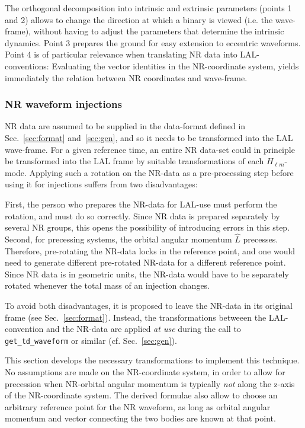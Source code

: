 \documentclass[11pt,tightenlines,article,amssymb,amsmath,amsfonts,superscriptaddress]{revtex4}
\newcommand{\lNR}{\hat L}
\begin{document}
The orthogonal decomposition into intrinsic and extrinsic parameters
(points 1 and 2) allows to change the direction at which a binary is
viewed (i.e. the wave-frame), without having to adjust the parameters
that determine the intrinsic dynamics.  Point 3 prepares the ground
for easy extension to eccentric waveforms.
Point 4 is of particular relevance when translating NR data into
LAL-conventions: Evaluating the vector identities in the NR-coordinate
system, yields immediately the relation between NR coordinates and
wave-frame.


\subsubsection{NR waveform injections}

NR data are assumed to be supplied in the data-format defined in
Sec.~\ref{sec:format} and~\ref{sec:gen}, and so it needs to be
transformed into the LAL wave-frame.  For a given reference time, an
entire NR data-set could in principle be transformed into the LAL
frame by suitable transformations of each $H_{\ell m}$-mode.  Applying
such a rotation on the NR-data as a pre-processing step
before using it for injections suffers from two disadvantages:

First, the person who prepares the NR-data for LAL-use must perform
the rotation, and must do so correctly. Since NR data is prepared
separately by several NR groups, this opens the possibility of
introducing errors in this step.  Second, for precessing systems, the
orbital angular momentum $\lNR$ precesses.  Therefore, pre-rotating
the NR-data locks in the reference point, and one would need to
generate different pre-rotated NR-data for a different reference point.
Since NR data is in geometric units, the NR-data would have to be
separately rotated whenever the total mass of an injection changes.

To avoid both disadvantages, it is proposed to leave the NR-data in
its original frame (see Sec.~\ref{sec:format}).  Instead, the transformations betweeen the
LAL-convention and the NR-data are applied \emph{at use} during the
call to \texttt{get\_td\_waveform} or similar (cf. Sec.~\ref{sec:gen}).

This section develops the necessary transformations to implement this
technique.  No assumptions are made on the NR-coordinate system, in
order to allow for precession when NR-orbital angular momentum is
typically \emph{not} along the z-axis of the NR-coordinate system.
The derived formulae also allow to choose an arbitrary reference point
for the NR waveform, as long as orbital angular momentum and vector
connecting the two bodies are known at that point.
\end{document}
